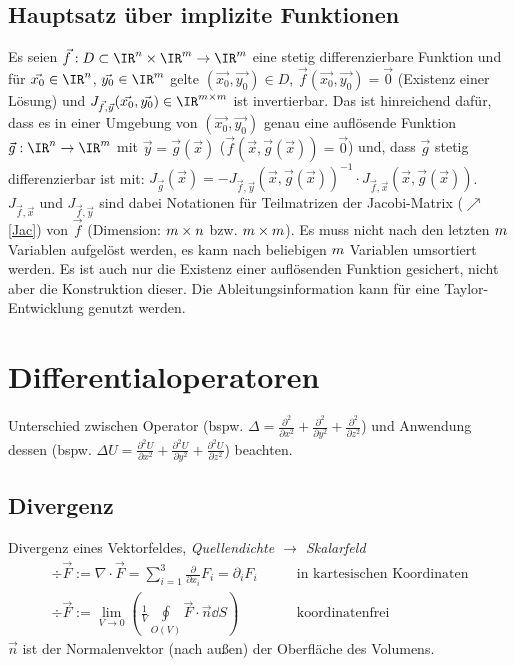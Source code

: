\subsection{Hauptsatz über implizite Funktionen}\label{hs_impl}
Es seien $\vec{f}:D\subset\IR^{\color{green}n}\times\IR^{\color{red}m}\rightarrow\IR^{\color{red}m}$ eine stetig differenzierbare Funktion und für $\vec{x_0}\in\IR^{\color{green}n}$, $\vec{y_0}\in\IR^{\color{red}m}$ gelte $(\vec{x_0},\vec{y_0})\in D$, $\vec{f}(\vec{x_0},\vec{y_0})=\vec{0}$ (Existenz einer Lösung) und $J_{\vec{f},\vec{y}}(\vec{x_0},\vec{y_0})\in \IR^{\color{red} m\times m}$ ist invertierbar. Das ist hinreichend dafür, dass es in einer Umgebung von $(\vec{x_0},\vec{y_0})$ genau eine auflösende Funktion $\vec{g}:\IR^{\color{green}n}\rightarrow\IR^{\color{red}m}$ mit $\vec{y}=\vec{g}(\vec{x})$ ($\vec{f}(\vec{x},\vec{g}(\vec{x}))=\vec{0}$) und, dass $\vec{g}$ stetig differenzierbar ist mit: $J_{\vec{g}} (\vec{x})=-J_{\vec{f},\vec{y}}(\vec{x},\vec{g}(\vec{x}))^{-1}\cdot J_{\vec{f},\vec{x}}(\vec{x},\vec{g}(\vec{x}))$.\\
$J_{\vec{f},\vec{x}}$ und $J_{\vec{f},\vec{y}}$ sind dabei Notationen für Teilmatrizen der Jacobi-Matrix ($\nearrow$ \ref{Jac}) von $\vec{f}$ (Dimension: ${\color{red}m}\times{\color{green}n}$ bzw. ${\color{red}m}\times{\color{red}m}$). Es muss nicht nach den letzten ${\color{red}m}$ Variablen aufgelöst werden, es kann nach beliebigen ${\color{red}m}$ Variablen umsortiert werden. Es ist auch nur die Existenz einer auflösenden Funktion gesichert, nicht aber die Konstruktion dieser. Die Ableitungsinformation kann für eine Taylor-Entwicklung genutzt werden.
 \section{Differentialoperatoren}
 Unterschied zwischen Operator (bspw. $\Delta=\frac{\partial^2 }{\partial x^2}+\frac{\partial^2 }{\partial y^2}+\frac{\partial^2 }{\partial z^2}$) und Anwendung dessen (bspw. $\Delta U=\frac{\partial^2 U}{\partial x^2}+\frac{\partial^2 U}{\partial y^2}+\frac{\partial^2 U}{\partial z^2}$) beachten.
  \subsection{Divergenz}
	  Divergenz eines Vektorfeldes, \textit{Quellendichte $\to$ Skalarfeld}
	  \begin{equation}
		  \begin{split}
			  \div \vec{F}:= \nabla \cdot \vec{F}= \sum_{i=1}^{3} \frac{\partial}{\partial
				  x_{i}}F_{i} = \partial_{i} F_{i}&\qquad \text{in kartesischen Koordinaten}\\
			  \div \vec{F}:= \lim_{V \to 0}\left( \frac{1}{V}\oint\limits_{O(V)}\vec{F}\cdot
			  \vec{n}\dd S\right)&\qquad\text{koordinatenfrei}
		  \end{split}
	  \end{equation}
	  $\vec{n}$ ist der Normalenvektor (nach außen) der Oberfläche des Volumens.
